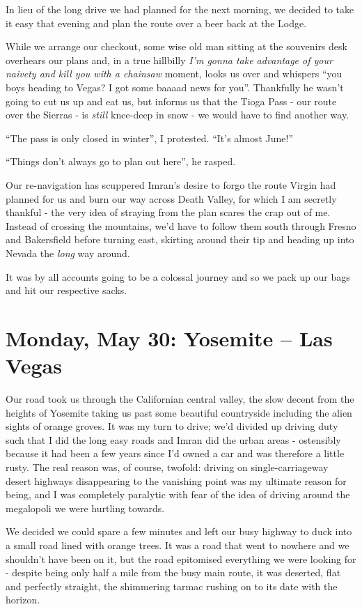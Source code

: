 \documentclass[a5paper,titlepage,11pt,draft]{book}
\begin{document}
In lieu of the long drive we had planned for the next morning, we decided to take it easy that evening and plan the route over a beer back at the Lodge.

While we arrange our checkout, some wise old man sitting at the souvenirs desk overhears our plans and, in a true hillbilly \emph{I'm gonna take advantage of your naivety and kill you with a chainsaw} moment, looks us over and whispers ``you boys heading to Vegas? I got some baaaad news for you''.  Thankfully he wasn't going to cut us up and eat us, but informs us that the Tioga Pass - our route over the Sierras - is \emph{still} knee-deep in snow - we would have to find another way.

``The pass is only closed in winter'', I protested.  ``It's almost June!''

``Things don't always go to plan out here'', he rasped.

Our re-navigation has scuppered Imran's desire to forgo the route Virgin had planned for us and burn our way across Death Valley, for which I am secretly thankful - the very idea of straying from the plan scares the crap out of me.  Instead of crossing the mountains, we'd have to follow them south through Fresno and Bakersfield before turning east, skirting around their tip and heading up into Nevada the \emph{long} way around.

It was by all accounts going to be a colossal journey and so we pack up our bags and hit our respective sacks.

\chapter[Yosemite -- Las Vegas]{Monday, May 30: Yosemite -- Las Vegas}
Our road took us through the Californian central valley, the slow decent from the heights of Yosemite taking us past some beautiful countryside including the alien sights of orange groves.  It was my turn to drive; we'd divided up driving duty such that I did the long easy roads and Imran did the urban areas - ostensibly because it had been a few years since I'd owned a car and was therefore a little rusty.  The real reason was, of course, twofold: driving on single-carriageway desert highways disappearing to the vanishing point was my ultimate reason for being, and I was completely paralytic with fear of the idea of driving around the megalopoli we were hurtling towards.

We decided we could spare a few minutes and left our busy highway to duck into a small road lined with orange trees.  It was a road that went to nowhere and we shouldn't have been on it, but the road epitomised everything we were looking for - despite being only half a mile from the busy main route, it was deserted, flat and perfectly straight, the shimmering tarmac rushing on to its date with the horizon.
\end{document}
